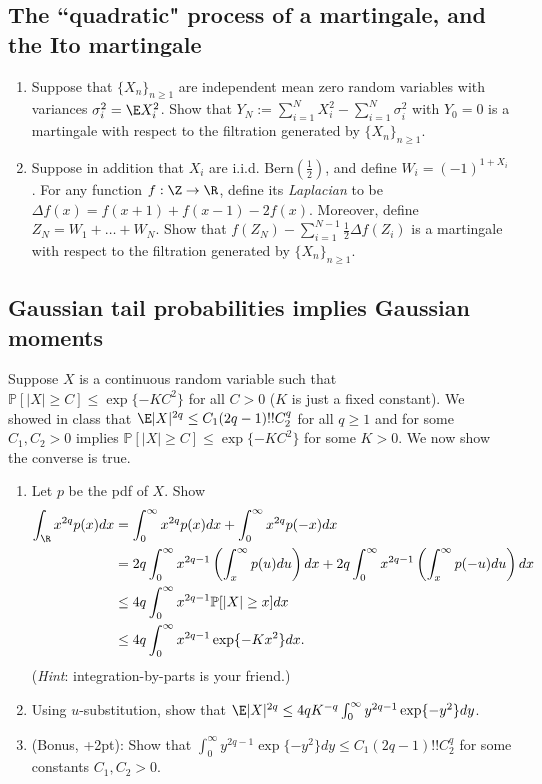 \documentclass[12pt,reqno]{amsart}
\theoremstyle{definition}
\theoremstyle{remark}
\numberwithin{equation}{section}
\begin{document}
\subsection{The ``quadratic" process of a martingale, and the Ito martingale}
\begin{enumerate}
\item Suppose that $\{X_{n}\}_{n\geq1}$ are independent mean zero random variables with variances $\sigma_{i}^{2}=\E X_{i}^{2}$. Show that $Y_{N}:=\sum_{i=1}^{N}X_{i}^{2}-\sum_{i=1}^{N}\sigma_{i}^{2}$ with $Y_{0}=0$ is a martingale with respect to the filtration generated by $\{X_{n}\}_{n\geq1}$.
\item Suppose in addition that $X_{i}$ are i.i.d. $\mathrm{Bern}(\frac12)$, and define $W_{i}=(-1)^{1+X_{i}}$. For any function $f:\Z\to\R$, define its \emph{Laplacian} to be $\Delta f(x)=f(x+1)+f(x-1)-2f(x)$. Moreover, define $Z_{N}=W_{1}+\ldots+W_{N}$. Show that $f(Z_{N})-\sum_{i=1}^{N-1}\frac12\Delta f(Z_{i})$ is a martingale with respect to the filtration generated by $\{X_{n}\}_{n\geq1}$.
\end{enumerate}
\subsection{Gaussian tail probabilities implies Gaussian moments}
Suppose $X$ is a continuous random variable such that $\mathbb{P}[|X|\geq C]\leq\exp\{-KC^{2}\}$ for all $C>0$ ($K$ is just a fixed constant). {\color{red}We showed in class that $\E|X|^{2q}\leq C_{1}(2q-1)!!C_{2}^{q}$ for all $q\geq1$ and for some $C_{1},C_{2}>0$ implies $\mathbb{P}[|X|\geq C]\leq\exp\{-KC^{2}\}$ for some $K>0$. We now show the converse is true.}
\begin{enumerate}
\item Let $p$ be the pdf of $X$. Show
%
\begin{align*}
\int_{\R}x^{2q}p(x)dx&=\int_{0}^{\infty}x^{2q}p(x)dx+\int_{0}^{\infty}x^{2q}p(-x)dx\\
&=2q\int_{0}^{\infty}x^{2q-1}\left(\int_{x}^{\infty}p(u)du\right)dx+2q\int_{0}^{\infty}x^{2q-1}\left(\int_{x}^{\infty}p(-u)du\right)dx\\
&\leq 4q\int_{0}^{\infty}x^{2q-1}\mathbb{P}[|X|\geq x]dx\\
&\leq 4q\int_{0}^{\infty}x^{2q-1}\exp\{-Kx^{2}\}dx.
\end{align*}
%
(\emph{Hint}: integration-by-parts is your friend.)
\item Using $u$-substitution, show that $\E|X|^{2q}\leq 4qK^{-q}\int_{0}^{\infty}y^{2q-1}\exp\{-y^{2}\}dy$.
\item (Bonus, +2pt): Show that $\int_{0}^{\infty}y^{2q-1}\exp\{-y^{2}\}dy\leq C_{1}(2q-1)!!C_{2}^{q}$ for some constants $C_{1},C_{2}>0$.
\end{enumerate}
\end{document}
